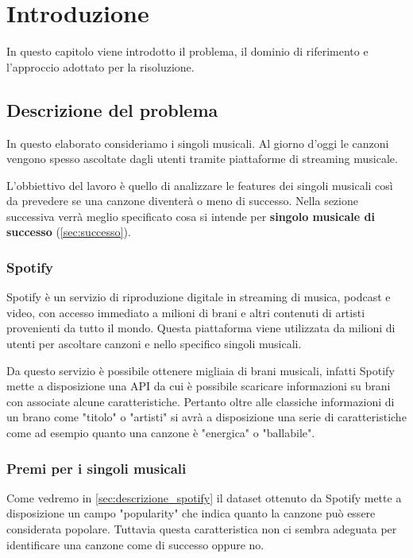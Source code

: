 \chapter{Introduzione}

In questo capitolo viene introdotto il problema, il dominio di
riferimento e l'approccio adottato per la risoluzione.

\section{Descrizione del problema}
In questo elaborato consideriamo i singoli musicali. Al giorno d'oggi
le canzoni vengono spesso ascoltate dagli utenti tramite piattaforme di
streaming musicale.

L'obbiettivo del lavoro è quello di analizzare le features dei singoli
musicali così da prevedere se una canzone diventerà o meno di
successo. Nella sezione successiva verrà meglio specificato cosa si
intende per \textbf{singolo musicale di successo}
(\autoref{sec:successo}).

\subsection{Spotify}
Spotify è un servizio di riproduzione digitale in streaming di musica,
podcast e video, con accesso immediato a milioni di brani e altri
contenuti di artisti provenienti da tutto il mondo. Questa piattaforma
viene utilizzata da milioni di utenti per ascoltare canzoni e nello
specifico singoli musicali.

Da questo servizio è possibile ottenere migliaia di brani musicali,
infatti Spotify mette a disposizione una API da cui è possibile
scaricare informazioni su brani con associate alcune
caratteristiche. Pertanto oltre alle classiche informazioni di un
brano come "titolo" o "artisti" si avrà a disposizione una serie di
caratteristiche come ad esempio quanto una canzone è "energica" o
"ballabile".


\subsection{Premi per i singoli musicali}
\label{sec:successo}

Come vedremo in \autoref{sec:descrizione_spotify} il dataset ottenuto
da Spotify mette a disposizione un campo "popularity" che indica
quanto la canzone può essere considerata popolare. Tuttavia questa
caratteristica non ci sembra adeguata per identificare una canzone
come di successo oppure no.

